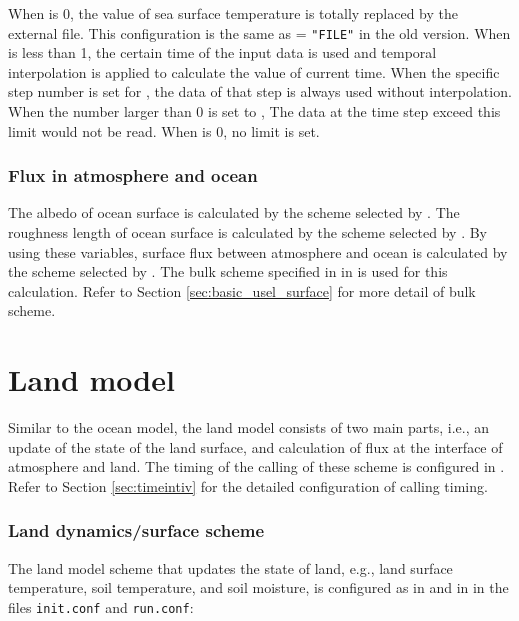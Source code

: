 When  is 0, the value of sea surface temperature is totally replaced by the external file. This configuration is the same as  = \verb|"FILE"| in the old version.
%
When  is less than 1, the certain time of the input data is used and temporal interpolation is applied to calculate the value of current time. When the specific step number is set for , the data of that step is always used without interpolation.
%
When the number larger than 0 is set to , The data at the time step exceed this limit would not be read. When  is 0, no limit is set.

\subsubsection{Flux in atmosphere and ocean}
The albedo of ocean surface is calculated by the scheme selected by . The roughness length of ocean surface is calculated by the scheme selected by . By using these variables, surface flux between atmosphere and ocean is calculated by the scheme selected by . The bulk scheme specified in  in  is used for this calculation. Refer to Section \ref{sec:basic_usel_surface} for more detail of bulk scheme.



\section{Land model} \label{sec:basic_usel_land}
Similar to the ocean model, the land model consists of two main parts, i.e., an update of the state of the land surface, and calculation of flux at the interface of atmosphere and land. The timing of the calling of these scheme is configured in . Refer to Section \ref{sec:timeintiv} for the detailed configuration of calling timing.

\subsubsection{Land dynamics/surface scheme}
The land model scheme that updates the state of land, e.g., land surface temperature, soil temperature, and soil moisture, is configured as in  and  in  in the files \verb|init.conf| and \verb|run.conf|:

